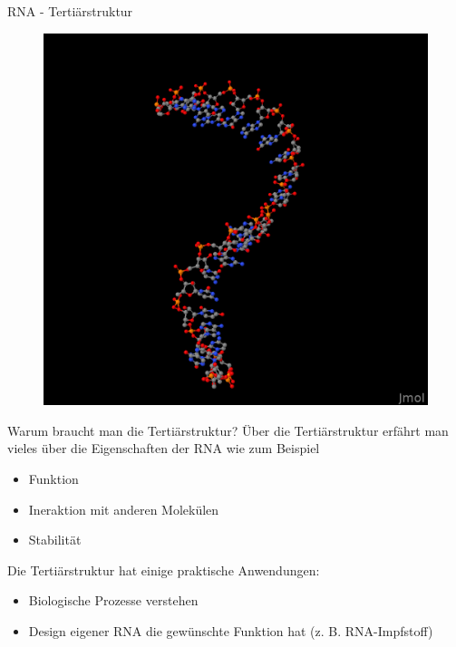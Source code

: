 \begin{frame}{RNA - Tertiärstruktur}
\vspace*{\fill}
\begin{figure}
	\includegraphics[width=.4\textwidth]{imgs/tst.png}
\end{figure}	
\vspace*{\fill}
\end{frame}

\begin{frame}{Warum braucht man die Tertiärstruktur?}
	Über die Tertiärstruktur erfährt man vieles über die Eigenschaften der RNA wie zum Beispiel
	\begin{itemize}
			\item Funktion
			\item Ineraktion mit anderen Molekülen
			\item Stabilität
	\end{itemize}
	\vspace{.5cm}
	Die Tertiärstruktur hat einige praktische Anwendungen:
	\begin{itemize}
			\item Biologische Prozesse verstehen
			\item Design eigener RNA die gewünschte Funktion hat (z. B. RNA-Impfstoff)
	\end{itemize}

\end{frame}
